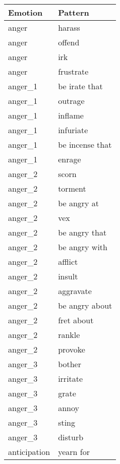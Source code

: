 \begin{longtable}{l|l}
{\bf Emotion}   & {\bf Pattern}         \\\hline\hline
anger           & harass                \\
anger           & offend                \\
anger           & irk                   \\
anger           & frustrate             \\
anger\_1        & be irate that         \\
anger\_1        & outrage               \\
anger\_1        & inflame               \\
anger\_1        & infuriate             \\
anger\_1        & be incense that       \\
anger\_1        & enrage                \\
anger\_2        & scorn                 \\
anger\_2        & torment               \\
anger\_2        & be angry at           \\
anger\_2        & vex                   \\
anger\_2        & be angry that         \\
anger\_2        & be angry with         \\
anger\_2        & afflict               \\
anger\_2        & insult                \\
anger\_2        & aggravate             \\
anger\_2        & be angry about        \\
anger\_2        & fret about            \\
anger\_2        & rankle                \\
anger\_2        & provoke               \\
anger\_3        & bother                \\
anger\_3        & irritate              \\
anger\_3        & grate                 \\
anger\_3        & annoy                 \\
anger\_3        & sting                 \\
anger\_3        & disturb               \\
anticipation    & yearn for             \\

\end{longtable}
